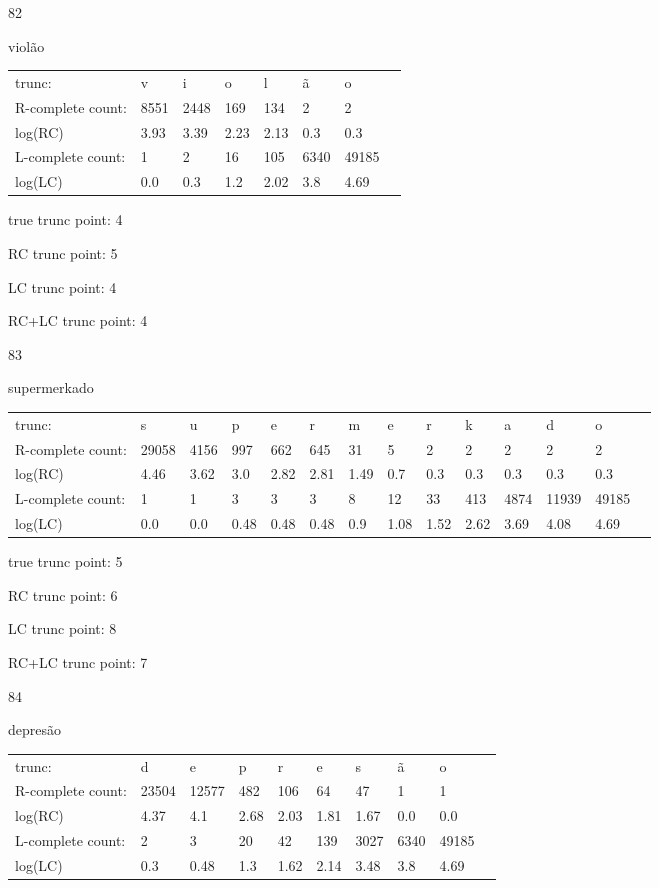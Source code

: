 \documentclass{article}
\begin{document}
82

violão

\begin{tabular}{l|lllllll}
trunc: & v & i & o & l & ã & o & \\ 
R-complete count: & 8551 & 2448 & 169 & 134 & 2 & 2 & \\ 
log(RC) & 3.93 & 3.39 & 2.23 & 2.13 & 0.3 & 0.3 & \\ 
L-complete count: & 1 & 2 & 16 & 105 & 6340 & 49185 & \\ 
log(LC) & 0.0 & 0.3 & 1.2 & 2.02 & 3.8 & 4.69 & \\ 
\end{tabular}

true trunc point: 4

RC trunc point: 5

LC trunc point: 4

RC+LC trunc point: 4

\vspace{1em}

83

supermerkado

\begin{tabular}{l|lllllllllllll}
trunc: & s & u & p & e & r & m & e & r & k & a & d & o & \\ 
R-complete count: & 29058 & 4156 & 997 & 662 & 645 & 31 & 5 & 2 & 2 & 2 & 2 & 2 & \\ 
log(RC) & 4.46 & 3.62 & 3.0 & 2.82 & 2.81 & 1.49 & 0.7 & 0.3 & 0.3 & 0.3 & 0.3 & 0.3 & \\ 
L-complete count: & 1 & 1 & 3 & 3 & 3 & 8 & 12 & 33 & 413 & 4874 & 11939 & 49185 & \\ 
log(LC) & 0.0 & 0.0 & 0.48 & 0.48 & 0.48 & 0.9 & 1.08 & 1.52 & 2.62 & 3.69 & 4.08 & 4.69 & \\ 
\end{tabular}

true trunc point: 5

RC trunc point: 6

LC trunc point: 8

RC+LC trunc point: 7

\vspace{1em}

84

depresão

\begin{tabular}{l|lllllllll}
trunc: & d & e & p & r & e & s & ã & o & \\ 
R-complete count: & 23504 & 12577 & 482 & 106 & 64 & 47 & 1 & 1 & \\ 
log(RC) & 4.37 & 4.1 & 2.68 & 2.03 & 1.81 & 1.67 & 0.0 & 0.0 & \\ 
L-complete count: & 2 & 3 & 20 & 42 & 139 & 3027 & 6340 & 49185 & \\ 
log(LC) & 0.3 & 0.48 & 1.3 & 1.62 & 2.14 & 3.48 & 3.8 & 4.69 & \\ 
\end{tabular}
\end{document}
